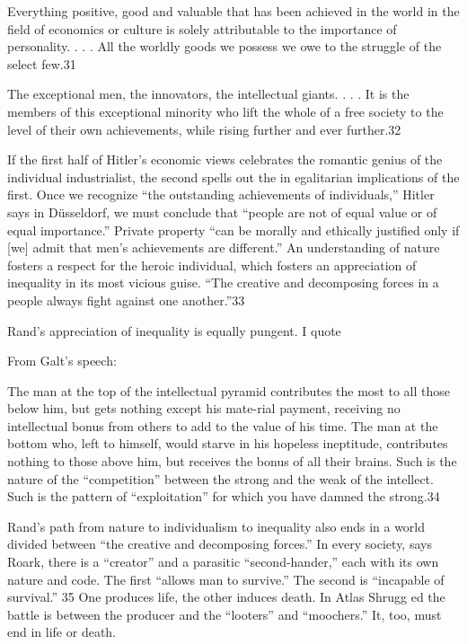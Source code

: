 Everything positive, good and valuable that has been achieved in the world in the field of economics or culture is solely attributable to the importance of personality. . . . All the worldly goods we possess we owe to the struggle of the select few.{\color{blue}31}
 \par 
The exceptional men, the innovators, the intellectual giants. . . . It is the members of this exceptional minority who lift the whole of a free society to the level of their own achievements, while rising further and ever further.{\color{blue}32}
 \par 
If the first half of Hitler’s economic views celebrates the romantic genius of the individual industrialist, the second spells out the in egalitarian implications of the first. Once we recognize “the outstanding achievements of individuals,” Hitler says in Düsseldorf, we must conclude that “people are not of equal value or of equal importance.” Private property “can be morally and ethically justified only if [we] admit that men’s achievements are different.” An understanding of nature fosters a respect for the heroic individual, which fosters an appreciation of inequality in its most vicious guise. “The creative and decomposing forces in a people always fight against one another.”{\color{blue}33}
 \par 
Rand’s appreciation of inequality is equally pungent. I quote
 \par 
From Galt’s speech:
 \par 
The man at the top of the intellectual pyramid contributes the most to all those below him, but gets nothing except his mate-rial payment, receiving no intellectual bonus from others to add to the value of his time. The man at the bottom who, left to himself, would starve in his hopeless ineptitude, contributes nothing to those above him, but receives the bonus of all their brains. Such is the nature of the “competition” between the strong and the weak of the intellect. Such is the pattern of “exploitation” for which you have damned the strong.{\color{blue}34}
 \par 
Rand’s path from nature to individualism to inequality also ends in a world divided between “the creative and decomposing forces.” In every society, says Roark, there is a “creator” and a parasitic “second-hander,” each with its own nature and code. The first “allows man to survive.” The second is “incapable of survival.” {\color{blue}35} One produces life, the other induces death. In Atlas Shrugg ed the battle is between the producer and the “looters” and “moochers.” It, too, must end in life or death.
